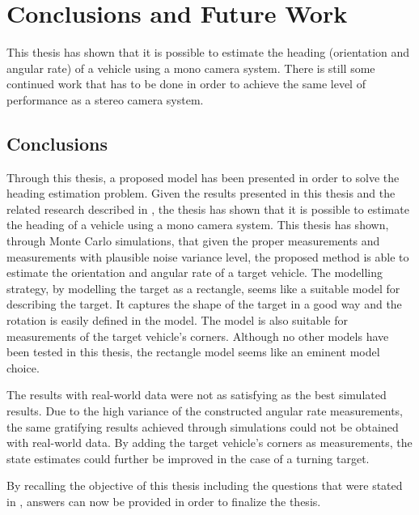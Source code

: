 \chapter{Conclusions and Future Work}
\label{cha:conclusions}

This thesis has shown that it is possible to estimate the heading (orientation and angular rate) of a vehicle using a mono camera system.
There is still some continued work that has to be done in order to achieve the same level of performance as a stereo camera system.

\section{Conclusions}
Through this thesis, a proposed model has been presented in order to solve the heading estimation problem.
Given the results presented in this thesis and the related research described in , the thesis has shown that it is possible to estimate the heading of a vehicle using a mono camera system.
This thesis has shown, through Monte Carlo simulations, that given the proper measurements and measurements with plausible noise variance level, the proposed method is able to estimate the orientation and angular rate of a target vehicle.
The modelling strategy, by modelling the target as a rectangle, seems like a suitable model for describing the target.
It captures the shape of the target in a good way and the rotation is easily defined in the model.
The model is also suitable for measurements of the target vehicle's corners.
Although no other models have been tested in this thesis, the rectangle model seems like an eminent model choice.

The results with real-world data were not as satisfying as the best simulated results.
Due to the high variance of the constructed angular rate measurements, the same gratifying results achieved through simulations could not be obtained with real-world data.
By adding the target vehicle's corners as measurements, the state estimates could further be improved in the case of a turning target.

\newpage

By recalling the objective of this thesis including the questions that were stated in , answers can now be provided in order to finalize the thesis.

